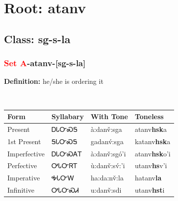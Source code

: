 \needspace{4in}
\section*{Root: atanv}
\nopagebreak
{}
\needspace{3in}
\subsection*{Class: sg-s-la}
\nopagebreak
\needspace{2in}
\subsubsection*{\textcolor{Red}{Set A}{-}\textbf{atanv}{-}[sg-s-la]}
\nopagebreak
\textbf{Definition: } he/she is ordering it
\\[0.5em]
\begin{tabularx}{\textwidth}{l X X X}%
\toprule%
\textbf{Form}&\textbf{Syllabary}&\textbf{With Tone}&\textbf{Toneless}\\%
\midrule%
Present&ᎠᏓᏅᏍᎦ&à:danv̌:sga&atanv\textbf{hsk}a\\%
1st Present&ᎦᏓᏅᏍᎦ&gadanv́:sga&katanv\textbf{hsk}a\\%
Imperfective&ᎠᏓᏅᏍᎪᎢ&à:danv̌:sgó’i&atanv\textbf{hsk}o'i\\%
Perfective&ᎤᏓᏅᏒᎢ&ù:danv̌:sv́:’i&utanv\textbf{hs}v'i\\%
Imperative&ᎭᏓᏅᎳ&ha:da:nv̌:la&hatanv\textbf{la}\\%
Infinitive&ᎤᏓᏅᏍᏗ&u:danv̌:sdi&utanv\textbf{hst}i\\%
\bottomrule%
\end{tabularx}
\\[1em]